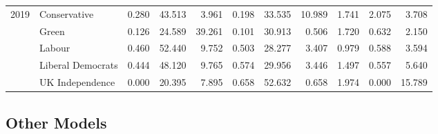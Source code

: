 \documentclass[preprint,12pt,authoryear]{elsarticle}
\begin{document}
\begin{landscape}
\begin{table}[!htbp]
{\begin{tabular}{@{} c l *{9}{r} @{}}
2019 & Conservative      & 0.280 & 43.513 & 3.961 & 0.198 & 33.535 & 10.989 & 1.741 & 2.075 & 3.708 \\
     & Green             & 0.126 & 24.589 & 39.261 & 0.101 & 30.913 & 0.506 & 1.720 & 0.632 & 2.150 \\
     & Labour            & 0.460 & 52.440 & 9.752 & 0.503 & 28.277 & 3.407 & 0.979 & 0.588 & 3.594 \\
     & Liberal Democrats & 0.444 & 48.120 & 9.765 & 0.574 & 29.956 & 3.446 & 1.497 & 0.557 & 5.640 \\
     & UK Independence   & 0.000 & 20.395 & 7.895 & 0.658 & 52.632 & 0.658 & 1.974 & 0.000 & 15.789 \\

\bottomrule
\end{tabular}
}
\end{table}
\end{landscape}

\newpage


\subsection{Other Models}
\end{document}

